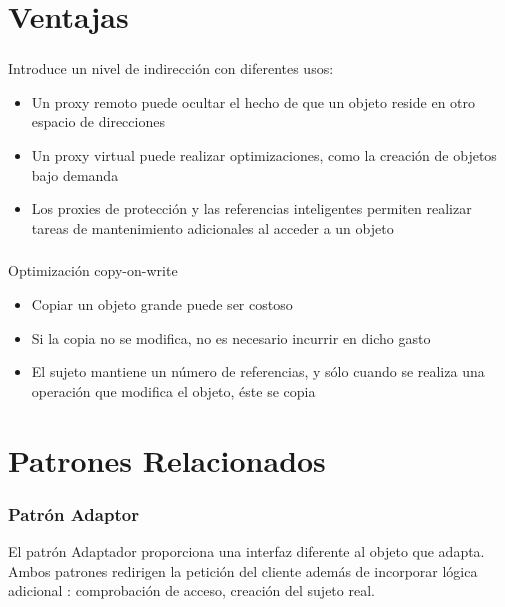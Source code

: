 \documentclass{beamer}
\begin{document}
\section[Ventajas]{Ventajas}

\begin{frame}{\insertsection{}}
  \frametitle{\insertsection{}}

  Introduce un nivel de indirección con diferentes usos:
  \begin{itemize}
  \item Un proxy remoto puede ocultar el hecho de que un objeto
    reside en otro espacio de direcciones 
  \item Un proxy virtual puede realizar optimizaciones, como la
    creación de objetos bajo demanda 
  \item Los proxies de protección y las referencias inteligentes
    permiten realizar tareas de mantenimiento adicionales al acceder
    a un objeto
  \end{itemize}
\end{frame}  
  
\begin{frame}{\insertsection{}}
  \frametitle{\insertsection{}}
  Optimización copy-on-write
  \begin{itemize}
  \item Copiar un objeto grande puede ser costoso
  \item Si la copia no se modifica, no es necesario incurrir en
    dicho gasto
  \item El sujeto mantiene un número de referencias, y sólo cuando
    se realiza una operación que modifica el objeto, éste se copia
  \end{itemize}    
\end{frame}  

\section{Patrones Relacionados}

\begin{frame}{\insertsection{}}
  \frametitle{Patrón Adaptor}
  El patrón Adaptador proporciona una interfaz diferente al objeto que
  adapta. Ambos patrones redirigen la petición del cliente además de
  incorporar lógica adicional : comprobación de   acceso, creación del
  sujeto real.
\end{frame}  
\end{document}
